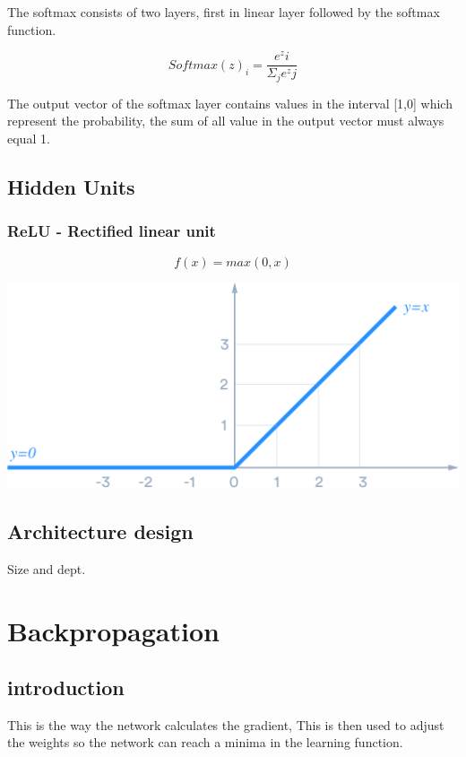 \documentclass[a4paper,10pt,titlepage]{report}
\begin{document}
The softmax consists of two layers, first in linear layer followed by the softmax function.

\begin{equation}
Softmax(z)_i = \frac{e^{z}i}{\Sigma_j e^z j}
\end{equation}

The output vector of the softmax layer contains values in the interval [1,0] which represent the probability, the sum of all value in the output vector must always equal 1.
\subsection{Hidden Units}
\subsubsection{ReLU - Rectified linear unit}

\begin{equation}
f(x) = max(0,x)
\end{equation}

\includegraphics[scale=0.1]{relu.png}

\subsection{Architecture design}
Size and dept.


\newpage
\section{Backpropagation}

\subsection{introduction}
This is the way the network calculates the gradient, This is then used to adjust the weights so the network can reach a minima in the learning function.
\end{document}
